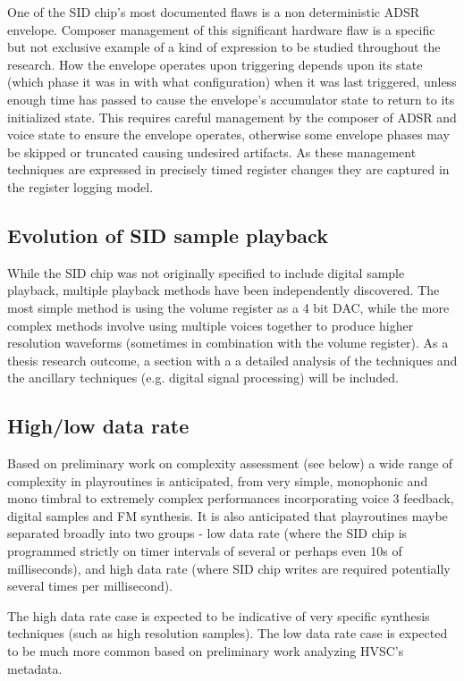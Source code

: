 \documentclass[10pt]{article}
\begin{document}
\begin{multicols*}{2}
One of the SID chip’s most documented flaws is a non deterministic ADSR envelope. Composer management of this significant hardware flaw is a specific but not exclusive example of a kind of expression to be studied throughout the research. How the envelope operates upon triggering depends upon its state (which phase it was in with what configuration) when it was last triggered, unless enough time has passed to cause the envelope’s accumulator state to return to its initialized state. This requires careful management by the composer of ADSR and voice state to ensure the envelope operates, otherwise some envelope phases may be skipped or truncated causing undesired artifacts. As these management techniques are expressed in precisely timed register changes they are captured in the register logging model.

\subsection{Evolution of SID sample playback}

While the SID chip was not originally specified to include digital sample playback, multiple playback methods have been independently discovered. The most simple method is using the volume register as a 4 bit DAC, while the more complex methods involve using multiple voices together to produce higher resolution waveforms (sometimes in combination with the volume register). As a thesis research outcome, a section with a a detailed analysis of the techniques and the ancillary techniques (e.g. digital signal processing) will be included.

\subsection{High/low data rate}

Based on preliminary work on complexity assessment (see below) a wide range of complexity in playroutines is anticipated, from very simple, monophonic and mono timbral to extremely complex performances incorporating voice 3 feedback, digital samples and FM synthesis. It is also anticipated that playroutines maybe separated broadly into two groups - low data rate (where the SID chip is programmed strictly on timer intervals of several or perhaps even 10s of milliseconds), and high data rate (where SID chip writes are required potentially several times per millisecond).

The high data rate case is expected to be indicative of very specific synthesis techniques (such as high resolution samples). The low data rate case is expected to be much more common based on preliminary work analyzing HVSC’s metadata.


\end{multicols*}
\end{document}
